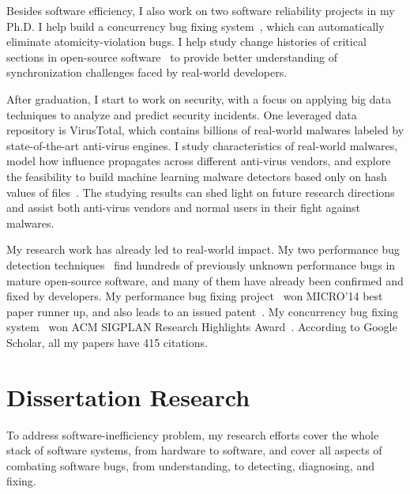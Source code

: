 \documentclass[10pt]{article}
\begin{document}
Besides software efficiency, I also work on two software reliability projects in my Ph.D. 
I help build a concurrency bug fixing system~\cite{jin11afix}, 
which can automatically eliminate atomicity-violation bugs.
I help study change histories of critical sections in open-source software~\cite{Gu15FSE} 
to provide better understanding of synchronization challenges faced by real-world developers. 

After graduation, I start to work on security, 
with a focus on applying big data techniques to analyze and predict security incidents. 
One leveraged data repository is VirusTotal, 
which contains billions of real-world malwares labeled by state-of-the-art anti-virus engines. 
I study characteristics of real-world malwares, 
model how influence propagates across different anti-virus vendors, 
and explore the feasibility to build machine learning malware detectors based only on hash values of files~\cite{Song16ApSys,Song17EuroSys}. 
The studying results can shed light on future research directions 
and assist both anti-virus vendors and normal users in their fight against malwares.

My research work has already led to real-world impact. 
My two performance bug detection techniques~\cite{jin12perfbug, Nistor13ICSE} find hundreds of previously unknown performance bugs in mature open-source software, 
and many of them have already been confirmed and fixed by developers. 
My performance bug fixing project~\cite{Song14MICRO} won MICRO'14 best paper runner up, and also leads to an issued patent~\cite{comppatent}.
My concurrency bug fixing system~\cite{jin11afix} won ACM SIGPLAN Research Highlights Award~\cite{afixnom}. 
According to Google Scholar, all my papers have 415 citations. 

\vspace{-.1in}
\section{Dissertation Research}

To address software-inefficiency problem, my research efforts cover the whole stack of software systems, from hardware to software, 
and cover all aspects of combating software bugs, from understanding, to detecting, diagnosing, and fixing. 

\vspace{-.1in}
\end{document}
